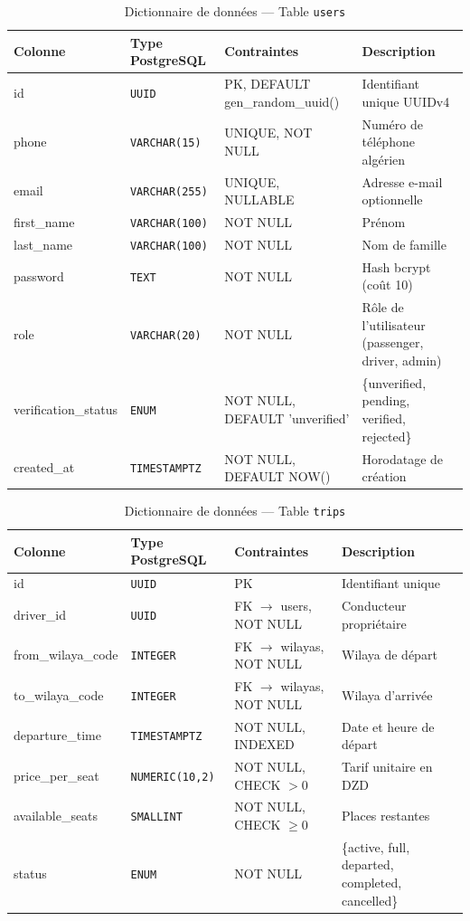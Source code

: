 \begin{table}[H]
\centering
\footnotesize
\begin{tabularx}{\textwidth}{|l|l|l|X|}
\hline
\rowcolor{rohlight}
\textbf{Colonne} & \textbf{Type PostgreSQL} & \textbf{Contraintes} & \textbf{Description} \\
\hline
id & \texttt{UUID} & PK, DEFAULT gen\_random\_uuid() & Identifiant unique UUIDv4 \\
\hline
phone & \texttt{VARCHAR(15)} & UNIQUE, NOT NULL & Numéro de téléphone algérien \\
\hline
email & \texttt{VARCHAR(255)} & UNIQUE, NULLABLE & Adresse e-mail optionnelle \\
\hline
first\_name & \texttt{VARCHAR(100)} & NOT NULL & Prénom \\
\hline
last\_name & \texttt{VARCHAR(100)} & NOT NULL & Nom de famille \\
\hline
password & \texttt{TEXT} & NOT NULL & Hash bcrypt (coût 10) \\
\hline
role & \texttt{VARCHAR(20)} & NOT NULL & Rôle de l'utilisateur (passenger, driver, admin) \\
\hline
verification\_status & \texttt{ENUM} & NOT NULL, DEFAULT 'unverified' & \{unverified, pending, verified, rejected\} \\
\hline
created\_at & \texttt{TIMESTAMPTZ} & NOT NULL, DEFAULT NOW() & Horodatage de création \\
\hline
\end{tabularx}
  \caption{Dictionnaire de données --- Table \texttt{users}}
  \label{tab:dd-users}
\end{table}

\begin{table}[H]
\centering
\footnotesize
\begin{tabularx}{\textwidth}{|l|l|l|X|}
\hline
\rowcolor{rohlight}
\textbf{Colonne} & \textbf{Type PostgreSQL} & \textbf{Contraintes} & \textbf{Description} \\
\hline
id & \texttt{UUID} & PK & Identifiant unique \\
\hline
driver\_id & \texttt{UUID} & FK $\to$ users, NOT NULL & Conducteur propriétaire \\
\hline
from\_wilaya\_code & \texttt{INTEGER} & FK $\to$ wilayas, NOT NULL & Wilaya de départ \\
\hline
to\_wilaya\_code & \texttt{INTEGER} & FK $\to$ wilayas, NOT NULL & Wilaya d'arrivée \\
\hline
departure\_time & \texttt{TIMESTAMPTZ} & NOT NULL, INDEXED & Date et heure de départ \\
\hline
price\_per\_seat & \texttt{NUMERIC(10,2)} & NOT NULL, CHECK $> 0$ & Tarif unitaire en DZD \\
\hline
available\_seats & \texttt{SMALLINT} & NOT NULL, CHECK $\geq 0$ & Places restantes \\
\hline
status & \texttt{ENUM} & NOT NULL & \{active, full, departed, completed, cancelled\} \\
\hline
\end{tabularx}
  \caption{Dictionnaire de données --- Table \texttt{trips}}
  \label{tab:dd-trips}
\end{table}

